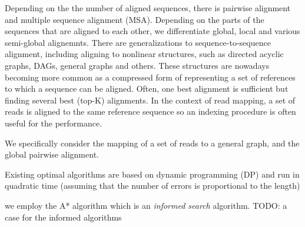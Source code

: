 Depending on the the number of aligned sequences, there is pairwise alignment
and multiple sequence alignment (MSA). Depending on the parts of the sequences
that are aligned to each other, we differentiate global, local and various
semi-global alignemnts. There are generalizations to sequence-to-sequence
alignment, including aligning to nonlinear structures, such as directed acyclic
graphs, DAGs, general graphs and others. These structures are nowadays becoming
more common as a compressed form of representing a set of references to which a
sequence can be aligned. Often, one best alignment is sufficient but finding
several best (top-K) alignments. In the context of read mapping, a set of reads
is aligned to the same reference sequence so an indexing procedure is often
useful for the performance.

We specifically consider the mapping of a set of reads to a general graph, and
the global pairwise alignment.

Existing optimal algorithms are based on dynamic programming (DP) and
run in quadratic time (assuming that the number of errors is proportional to the
length)

we employ the A* algorithm which is an \emph{informed search} algorithm.
TODO: a case for the informed algorithms